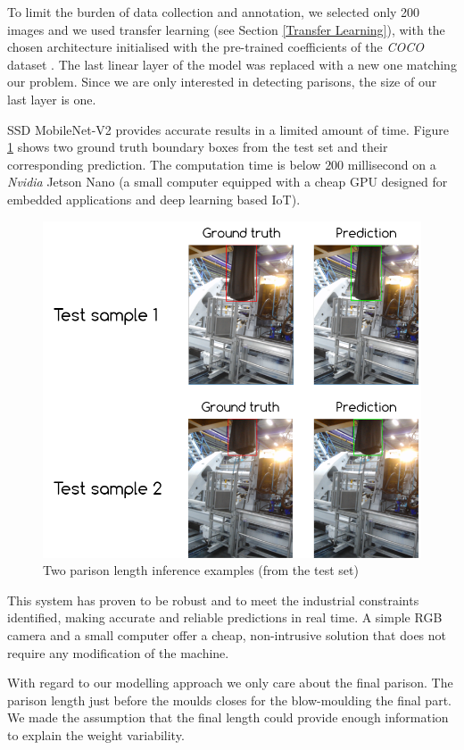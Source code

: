 To limit the burden of data collection and annotation, we selected only  200 images and we used transfer learning (see Section \ref{Transfer Learning}), with the chosen architecture initialised with the pre-trained coefficients of the \textit{COCO} dataset \citep{lin2014microsoft}. The last linear layer of the model was replaced with a new one matching our problem. Since we are only interested in detecting parisons, the size of our last layer is one.  

SSD MobileNet-V2 provides accurate results in a limited amount of time. Figure \ref{fig:parison_inference} shows two ground truth boundary boxes from the test set and their corresponding prediction. The computation time is below $200$ millisecond on a \textit{Nvidia} Jetson Nano (a small computer equipped with a cheap GPU designed for embedded applications and deep learning based IoT). 
%
\begin{figure}
\centerline{\includegraphics[scale=0.8]{images/chapter_3/parison_length_gt_prediction.png}}
\caption{Two parison length inference examples (from the test set)}
\label{fig:parison_inference}
\end{figure}
%
This system has proven to be robust and to meet the  industrial constraints identified, making accurate and reliable predictions in real time. A simple RGB camera and a small computer offer a cheap, non-intrusive solution that does not require any modification of the machine. 

With regard to our modelling approach we only care about the final parison. The parison length just before the moulds closes for the blow-moulding the final part. We made the assumption that the final length could provide enough information to explain the weight variability.

